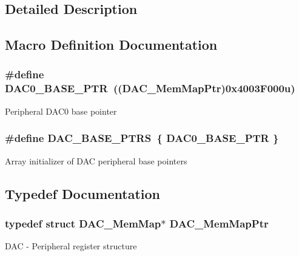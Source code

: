 \subsection{Detailed Description}


\subsection{Macro Definition Documentation}
\hypertarget{group___d_a_c___peripheral_gabe3b30df06ec04e5c899efd6e49f1800}{}
\subsubsection[{D\+A\+C0\+\_\+\+B\+A\+S\+E\+\_\+\+P\+T\+R}]{\setlength{\rightskip}{0pt plus 5cm}\#define D\+A\+C0\+\_\+\+B\+A\+S\+E\+\_\+\+P\+T\+R~(({\bf D\+A\+C\+\_\+\+Mem\+Map\+Ptr})0x4003\+F000u)}\label{group___d_a_c___peripheral_gabe3b30df06ec04e5c899efd6e49f1800}
Peripheral D\+A\+C0 base pointer \hypertarget{group___d_a_c___peripheral_gab47690040e4d63adc4f324358c27157a}{}
\subsubsection[{D\+A\+C\+\_\+\+B\+A\+S\+E\+\_\+\+P\+T\+R\+S}]{\setlength{\rightskip}{0pt plus 5cm}\#define D\+A\+C\+\_\+\+B\+A\+S\+E\+\_\+\+P\+T\+R\+S~\{ {\bf D\+A\+C0\+\_\+\+B\+A\+S\+E\+\_\+\+P\+T\+R} \}}\label{group___d_a_c___peripheral_gab47690040e4d63adc4f324358c27157a}
Array initializer of D\+A\+C peripheral base pointers 

\subsection{Typedef Documentation}
\hypertarget{group___d_a_c___peripheral_gaf4fffbe25ce148c577ec740897223a7f}{}
\subsubsection[{D\+A\+C\+\_\+\+Mem\+Map\+Ptr}]{\setlength{\rightskip}{0pt plus 5cm}typedef struct {\bf D\+A\+C\+\_\+\+Mem\+Map}$\ast$ {\bf D\+A\+C\+\_\+\+Mem\+Map\+Ptr}}\label{group___d_a_c___peripheral_gaf4fffbe25ce148c577ec740897223a7f}
D\+A\+C -\/ Peripheral register structure 